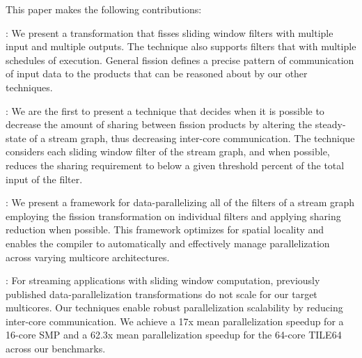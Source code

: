 This paper makes the following contributions:
\begin{itemize}

  : We present a
  transformation that fisses sliding window filters with multiple
  input and multiple outputs.  The technique also supports filters
  that with multiple schedules of execution.  General fission defines
  a precise pattern of communication of input data to the products
  that can be reasoned about by our other techniques.

  : We are the first to present a technique
  that decides when it is possible to decrease the amount of sharing
  between fission products by altering the steady-state of a stream
  graph, thus decreasing inter-core communication.  The technique
  considers each sliding window filter of the stream graph,
  and when possible, reduces the sharing requirement to below a given
  threshold percent of the total input of the filter. 

  : We present a
  framework for data-parallelizing all of the filters of a stream
  graph employing the fission transformation on individual filters and
  applying sharing reduction when possible.  This framework optimizes
  for spatial locality and enables the compiler to automatically and
  effectively manage parallelization across varying multicore
  architectures.

  : For
  streaming applications with sliding window computation, previously
  published data-parallelization transformations do not scale for our
  target multicores. Our techniques enable robust parallelization
  scalability by reducing inter-core communication.  We achieve a 17x
  mean parallelization speedup for a 16-core SMP and a 62.3x mean
  parallelization speedup for the 64-core TILE64 across our benchmarks.

\end{itemize}

